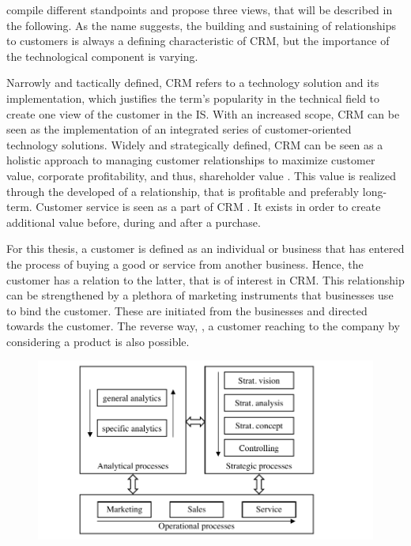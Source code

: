 		\cite{paynefrow2005} compile different standpoints and propose three views, that will be described in the following. As the name suggests, the building and sustaining of relationships to customers is always a defining characteristic of \acrshort{CRM}, but the importance of the technological component is varying. 
		
		Narrowly and tactically defined, \acrshort{CRM} refers to a technology solution and its implementation, which justifies the term's popularity in the technical field to create one view of the customer in the \acrshort{IS}. With an increased scope, \acrshort{CRM} can be seen as the implementation of an integrated series of customer-oriented technology solutions. Widely and strategically defined, \acrshort{CRM} can be seen as a holistic approach to managing customer relationships to maximize customer value, corporate profitability, and thus, shareholder value \cite{payne2004role}. This value is realized through the developed of a relationship, that is profitable and preferably long-term. Customer service is seen as a part of \acrshort{CRM} \citep[]{Helmke_2012}. It exists in order to create additional value before, during and after a purchase. 
	
		For this thesis, a customer is defined as an individual or business that has entered the process of buying a good or service from another business. Hence, the customer has a relation to the latter, that is of interest in CRM. This relationship can be strengthened by a plethora of marketing instruments that businesses use to bind the customer. These are initiated from the businesses and directed towards the customer. The reverse way, \ie, a customer reaching to the company by considering a product is also possible. 
		
			\begin{figure}[caption={CRM processes}, label={fig:crmprocessfr}]
			{	\includegraphics[width=.8\textwidth]{figures/crmprocessfr.pdf}
				
		\hspace{6.2cm}	\citep[]{Helmke_2012}
				
			 }
		\end{figure}
		
